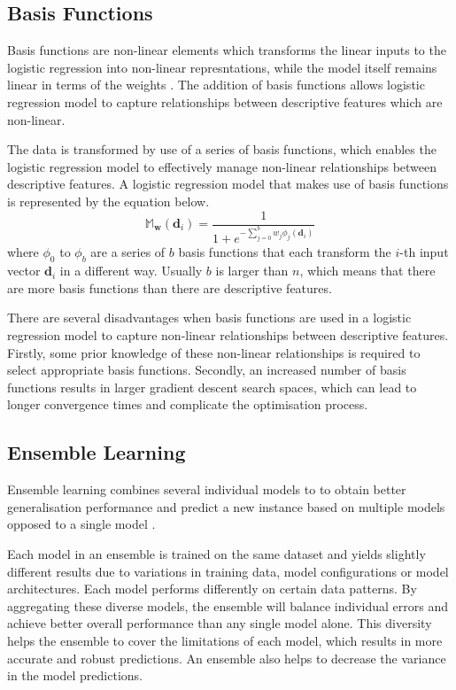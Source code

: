 \documentclass[10pt, conference]{IEEEtran}
\begin{document}
\subsection{Basis Functions} \label{section: basis_functions_background}

Basis functions are non-linear elements which transforms the linear inputs to the logistic regression
into non-linear represntations, while the model itself remains linear in terms of the weights \cite{basis_fun_ref}.
The addition of basis functions allows logistic regression model to capture relationships between descriptive
features which are non-linear.

The data is transformed by use of a series of basis functions, which enables the logistic regression model to effectively
manage non-linear relationships between descriptive features. A logistic regression model that makes use of
basis functions is represented by the equation below.
\begin{equation}
    \mathbb{M}_{\textbf{w}}(\textbf{d}_i) = \frac{1}{1 + e^{-\sum_{j=0}^{b}w_j \phi_j(\textbf{d}_i)}} \label{eq: non_logistic_regression_equation}
\end{equation}
where $\phi_0$ to $\phi_b$ are a series of $b$ basis functions that each transform the $i$-th input vector $\textbf{d}_i$ in a different way.
Usually $b$ is larger than $n$, which means that there are more basis functions than there are descriptive features.

There are several disadvantages when basis functions are used in a logistic regression model to capture non-linear relationships
between descriptive features. Firstly, some prior knowledge of these non-linear relationships is required to select appropriate
basis functions. Secondly, an increased number of basis functions results in larger gradient descent search spaces, which can lead to
longer convergence times and complicate the optimisation process.

\subsection{Ensemble Learning}

Ensemble learning combines several individual models to to obtain better generalisation performance and predict a new instance
based on multiple models opposed to a single model \cite{Ensemble_ref}.

Each model in an ensemble is trained on the same dataset and yields slightly different results due to variations
in training data, model configurations or model architectures. Each model performs differently on certain data
patterns. By aggregating these diverse models, the ensemble will balance individual errors and
achieve better overall performance than any single model alone. This diversity helps the ensemble to cover the
limitations of each model, which results in more accurate and robust predictions. An ensemble also helps to
decrease the variance in the model predictions.
\end{document}
